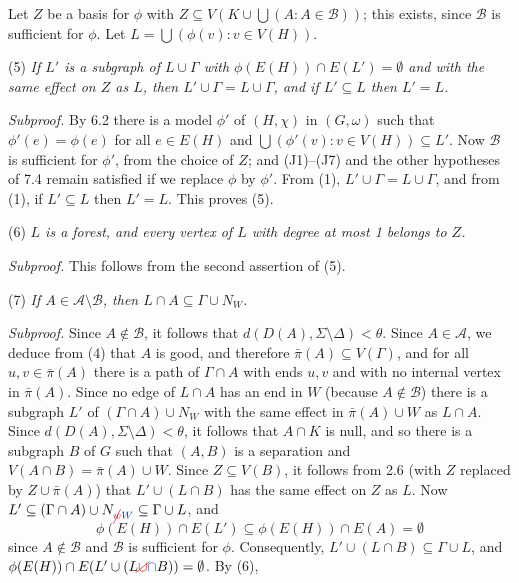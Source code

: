 Let $Z$ be a basis for $\phi$ with $Z \subseteq V(K \cup \bigcup(A : A \in \mathcal{B}))$; this exists, since $\mathcal{B}$ is sufficient for $\phi$. Let $L = \bigcup(\phi(v) : v \in V(H))$.

\hspace*{12pt}(5) \textit{If $L'$ is a subgraph of $L \cup \Gamma$ with $\phi(E(H)) \cap E(L') = \emptyset$ and with the same effect on $Z$ as $L$, then $L' \cup \Gamma = L \cup \Gamma$, and if $L' \subseteq L$ then $L' = L$.}

\textit{Subproof.} By 6.2 there is a model $\phi'$ of $(H, \chi)$ in $(G, \omega)$ such that $\phi'(e) = \phi(e)$ for all $e \in E(H)$ and $\bigcup(\phi'(v) : v \in V(H)) \subseteq L'$. Now $\mathcal{B}$ is sufficient for $\phi'$, from the choice of $Z$; and (J1)--(J7) and the other hypotheses of 7.4 remain satisfied if we replace $\phi$ by $\phi'$. From (1), $L' \cup \Gamma = L \cup \Gamma$, and from (1), if $L' \subseteq L$ then $L' = L$. This proves (5).

\hspace*{12pt}(6) \textit{$L$ is a forest, and every vertex of $L$ with degree at most 1 belongs to $Z$.}

\textit{Subproof.} This follows from the second assertion of (5).

\hspace*{12pt}(7) \textit{If $A \in \mathcal{A} \setminus \mathcal{B}$, then $L \cap A \subseteq \Gamma \cup N_W$.}

\textit{Subproof.} Since $A \notin \mathcal{B}$, it follows that $d(D(A), \Sigma \setminus \Delta) < \theta$. Since $A \in \mathcal{A}$, we deduce from (4) that $A$ is good, and therefore $\bar{\pi}(A) \subseteq V(\Gamma)$, and for all $u, v \in \bar{\pi}(A)$ there is a path of $\Gamma \cap A$ with ends $u, v$ and with no internal vertex in $\bar{\pi}(A)$. Since no edge of $L \cap A$ has an end in $W$ (because $A \notin \mathcal{B}$) there is a subgraph $L'$ of $(\Gamma \cap A) \cup N_W$ with the same effect in $\bar{\pi}(A) \cup W$ as $L \cap A$. Since $d(D(A), \Sigma \setminus \Delta) < \theta$, it follows that $A \cap K$ is null, and so there is a subgraph $B$ of $G$ such that $(A, B)$ is a separation and $V(A \cap B) = \bar{\pi}(A) \cup W$. Since $Z \subseteq V(B)$, it follows from 2.6 (with $Z$ replaced by $Z \cup \bar{\pi}(A)$) that $L' \cup (L \cap B)$ has the same effect on $Z$ as $L$. Now $L' \subseteq (\Gamma \cap A) \cup N_{\delm{w}\fix{W}} \subseteq \Gamma \cup L$, and
\begin{equation*}
\phi(E(H)) \cap E(L') \subseteq \phi(E(H)) \cap E(A) = \emptyset
\end{equation*}
since $A \notin \mathcal{B}$ and $\mathcal{B}$ is sufficient for $\phi$. Consequently, $L' \cup (L \cap B) \subseteq \Gamma \cup L$, and $\phi(E(H)) \cap E(L' \cup (L \delm{\cup}\fix{\cap} B)) = \emptyset$. By (6),
